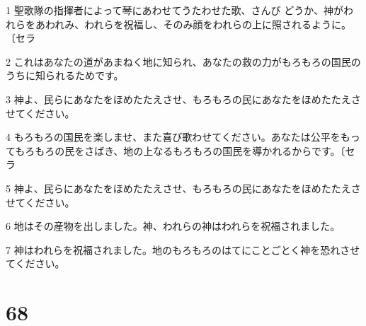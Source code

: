 \par 1 聖歌隊の指揮者によって琴にあわせてうたわせた歌、さんび どうか、神がわれらをあわれみ、われらを祝福し、そのみ顔をわれらの上に照されるように。〔セラ
\par 2 これはあなたの道があまねく地に知られ、あなたの救の力がもろもろの国民のうちに知られるためです。
\par 3 神よ、民らにあなたをほめたたえさせ、もろもろの民にあなたをほめたたえさせてください。
\par 4 もろもろの国民を楽しませ、また喜び歌わせてください。あなたは公平をもってもろもろの民をさばき、地の上なるもろもろの国民を導かれるからです。〔セラ
\par 5 神よ、民らにあなたをほめたたえさせ、もろもろの民にあなたをほめたたえさせてください。
\par 6 地はその産物を出しました。神、われらの神はわれらを祝福されました。
\par 7 神はわれらを祝福されました。地のもろもろのはてにことごとく神を恐れさせてください。

\chapter{68}

